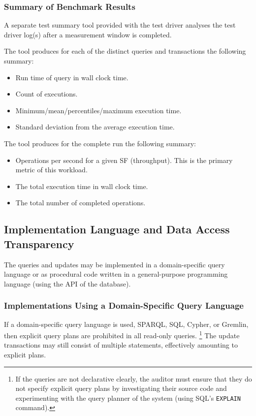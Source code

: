 \subsubsection{Summary of Benchmark Results}
\label{sec:performance-metrics}
A separate test summary tool provided with the test driver analyses the test driver log(s) after a measurement window is completed.

The tool produces for each of the distinct queries and transactions the following summary:
\begin{itemize}
    \item Run time of query in wall clock time.
    \item Count of executions.
    \item Minimum/mean/percentiles/maximum execution time.
    \item Standard deviation from the average execution time.
\end{itemize}
The tool produces for the complete run the following summary:
\begin{itemize}
    \item Operations per second for a given SF (throughput). This is the primary metric of this workload.
    \item The total execution time in wall clock time.
    \item The total number of completed operations.
\end{itemize}


\subsection{Implementation Language and Data Access Transparency}

The queries and updates may be implemented in a domain-specific query language or as procedural code written in a general-purpose programming language (\eg using the API of the database).

\subsubsection{Implementations Using a Domain-Specific Query Language}
\label{sec:finbench-domain-specific-query-language}

If a domain-specific query language is used, \eg SPARQL, SQL, Cypher, or Gremlin, then explicit query plans are prohibited in all read-only queries.%
\footnote{If the queries are not declarative clearly, the auditor must ensure that they do not specify explicit query plans by investigating their source code and experimenting with the query planner of the system (\eg using SQL's \texttt{EXPLAIN} command).}
The update transactions may still consist of multiple statements, effectively amounting to explicit plans.

